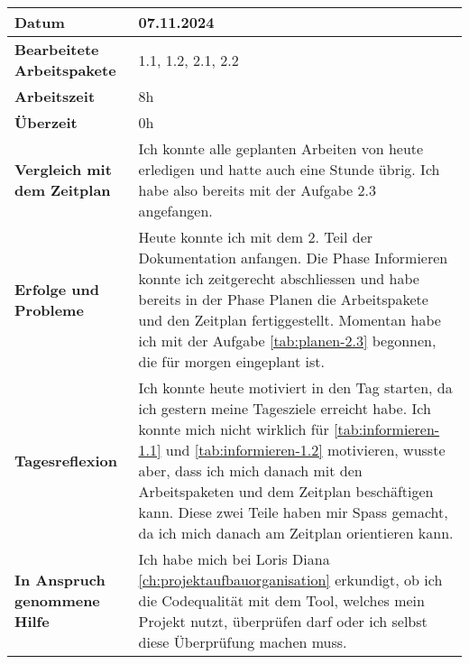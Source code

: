 \begin{longtable}{p{}|p{}}
	\hline
	\textbf{Datum}                       & 07.11.2024            \\
	\hline
	\textbf{Bearbeitete Arbeitspakete}   & 1.1, 1.2, 2.1, 2.2                  \\
	\hline
	\textbf{Arbeitszeit}                 & 8h                                    \\
	\hline
	\textbf{Überzeit}                    & 0h                                    \\
	\hline
	\textbf{Vergleich mit dem Zeitplan}  & Ich konnte alle geplanten Arbeiten von heute erledigen und hatte auch eine Stunde übrig. Ich habe also bereits mit der Aufgabe 2.3 angefangen. \\
	\hline
	\textbf{Erfolge und Probleme} & Heute konnte ich mit dem 2. Teil der Dokumentation anfangen. Die Phase Informieren konnte ich zeitgerecht abschliessen und habe bereits in der Phase Planen die Arbeitspakete und den Zeitplan fertiggestellt. Momentan habe ich mit der Aufgabe \ref{tab:planen-2.3} begonnen, die für morgen eingeplant ist.
	\\
	\hline
	\textbf{Tagesreflexion} & Ich konnte heute motiviert in den Tag starten, da ich gestern meine Tagesziele erreicht habe. Ich konnte mich nicht wirklich für \ref{tab:informieren-1.1} und \ref{tab:informieren-1.2} motivieren, wusste aber, dass ich mich danach mit den Arbeitspaketen und dem Zeitplan beschäftigen kann. Diese zwei Teile haben mir Spass gemacht, da ich mich danach am Zeitplan orientieren kann.
	\\
	\hline
	\textbf{In Anspruch genommene Hilfe} & Ich habe mich bei Loris Diana \ref{ch:projektaufbauorganisation} erkundigt, ob ich die Codequalität mit dem Tool, welches mein Projekt nutzt, überprüfen darf oder ich selbst diese Überprüfung machen muss.                                \\
	\hline
\end{longtable}\label{tab:arbeitsprotokoll-07.11.2024}
\newpage

